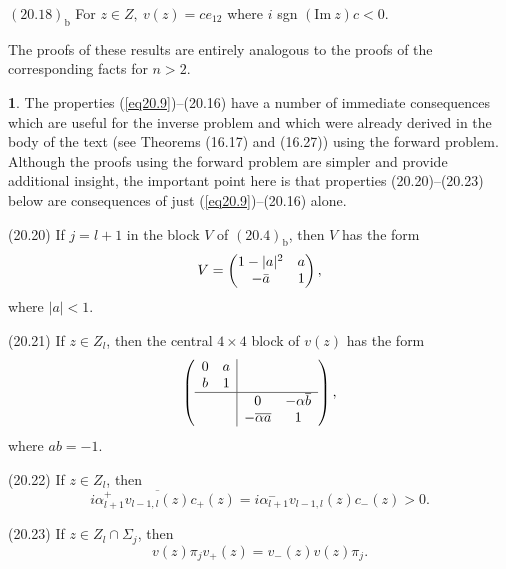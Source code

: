 \documentclass{surv-l}
\theoremstyle{plain}
\theoremstyle{definition}
\newtheorem{remark}[theorem]{\sc{Remark}}
\numberwithin{equation}{chapter}
\begin{document}
$\mathrm{(20.18)_{b}}$ For $z\in Z,\ v(z)=ce_{12}$ where $i$ sgn $({\mathrm{ Im}}\ z)c<0$.

The proofs of these results are entirely analogous to the proofs of the corresponding facts for $n>2$.
\setcounter{theorem}{18}
\begin{remark}\label{rem20.19}
The properties (\ref{eq20.9})--(20.16) have a number of immediate
consequences which are useful for the inverse problem and which were
already derived in the body of the text (see Theorems (16.17)
and (16.27)) using the forward problem. Although the proofs
using the forward problem are simpler and provide additional insight,
the important point here is that properties (20.20)--(20.23) below are
consequences of just (\ref{eq20.9})--(20.16) alone.
\end{remark}

(20.20) If $j=l+1$ in the block $V$ of $(20.4)_{\mathrm{b}}$, then $V$ has the form
\begin{equation*}
V=\left(\begin{array}{@{}cc@{}}
1-|a|^{2} & a\\
-\bar{a} & 1
\end{array}\right),
\end{equation*}
where $|a|<1$.

(20.21) If $z\in Z_{l}$, then the central $4\times 4$ block of $v(z)$ has the form
\begin{align*}
\left(\begin{tabular}{@{}c@{}|@{}c@{}}
$\begin{array}{cc}
   0 & a \\
   b & 1
\end{array}$ &  \\
\hline
 & $\begin{array}{cc}
0 & -\alpha\overline{b} \\
-\overline{\alpha}\overline{a} & 1
\end{array}$ \\
\end{tabular}\right),
\end{align*}
where $ab=-1$.
\renewcommand\theequation{\arabic{equation}}

(20.22) If $z\in Z_{l}$, then
\begin{equation*}
i\alpha_{l+1}^{+}\overline{v_{l-1,l}(z)}c_{+}(z)=i\alpha_{l+1}^{-}v_{l-1,l}(z)c_{-}(z)>0.
\end{equation*}

(20.23) If $z\in Z_{l}\cap\Sigma_{j}$, then
\begin{equation*}
v(z)\pi_{j}v_{+}(z)=v_{-}(z)v(z)\pi_{j}.
\end{equation*}
\end{document}
